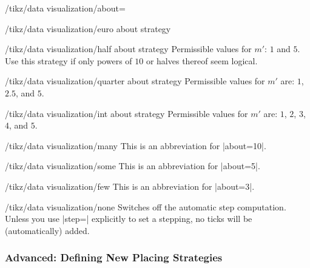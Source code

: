 \begin{key}{/tikz/data visualization/about=}
\begin{key}{/tikz/data visualization/euro about strategy}
  \end{key}

  \begin{key}{/tikz/data visualization/half about strategy}
    Permissible values for $m'$: $1$ and $5$. Use this
    strategy if only powers of $10$ or halves thereof seem logical.

  \end{key}

  \begin{key}{/tikz/data visualization/quarter about strategy}
    Permissible values for $m'$ are: $1$, $2.5$, and $5$.

  \end{key}

  \begin{key}{/tikz/data visualization/int about strategy}
    Permissible values for $m'$ are: $1$, $2$, $3$, $4$, and $5$.

  \end{key}
\end{key}

\begin{key}{/tikz/data visualization/many}
  This is an abbreviation for |about=10|.
\end{key}

\begin{key}{/tikz/data visualization/some}
  This is an abbreviation for |about=5|.
\end{key}

\begin{key}{/tikz/data visualization/few}
  This is an abbreviation for |about=3|.
\end{key}

\begin{key}{/tikz/data visualization/none}
  Switches off the automatic step computation. Unless you use |step=|
  explicitly to set a stepping, no ticks will be (automatically)
  added.
\end{key}




\subsubsection{Advanced: Defining New Placing Strategies}

